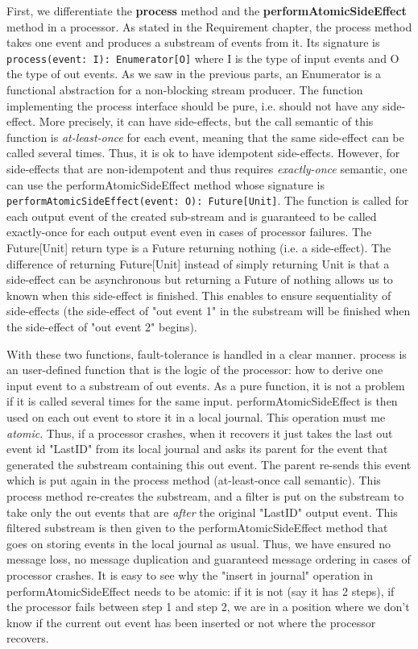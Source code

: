 First, we differentiate the \textbf{process} method and the \textbf{performAtomicSideEffect} method in a processor. As stated in the Requirement chapter, the process method 
takes one event and produces a substream of events from it. Its signature is \verb|process(event: I): Enumerator[O]| where I is the type of input events and O the type
of out events. As we saw in the previous parts, an Enumerator is a functional abstraction for a non-blocking stream producer. The function implementing the process interface
should be pure, i.e. should not have any side-effect. More precisely, it can have side-effects, but the call semantic of this function is \textit{at-least-once} for each 
event, meaning that the same side-effect can be called several times. Thus, it is ok to have idempotent side-effects. However, for side-effects that are non-idempotent and
thus requires \textit{exactly-once} semantic, one can use the performAtomicSideEffect method whose signature is \verb|performAtomicSideEffect(event: O): Future[Unit]|.
The function is called for each output event of the created sub-stream and is guaranteed to be called exactly-once for each output event even in cases of processor failures. The
Future[Unit] return type is a Future returning nothing (i.e. a side-effect). The difference of returning Future[Unit] instead of simply returning Unit is that a side-effect
can be asynchronous but returning a Future of nothing allows us to known when this side-effect is finished. This enables to ensure sequentiality of side-effects (the side-effect
of "out event 1" in the substream will be finished when the side-effect of "out event 2" begins).

With these two functions, fault-tolerance is handled in a clear manner. process is an user-defined function that is the logic of the processor: how to derive one input event to a substream of out events. As a pure function, it is not a problem if it is called several times for the same input. performAtomicSideEffect is then used on each out event to
store it in a local journal. This operation must me \textit{atomic}. Thus, if a processor crashes, when it recovers it just takes the last out event id "LastID" from its local journal and asks its parent for the event that generated the substream containing this out event. The parent re-sends this event which is put again in the process method (at-least-once call semantic).
This process method re-creates the substream, and a filter is put on the substream to take only the out events that are \textit{after} the original "LastID" output event. This
filtered substream is then given to the performAtomicSideEffect method that goes on storing events in the local journal as usual.
Thus, we have ensured no message loss, no message duplication and guaranteed message ordering in cases of processor crashes. It is easy to see why the "insert in journal" operation in performAtomicSideEffect needs to be atomic: if it is not (say it has 2 steps), if the processor fails between step 1 and step 2, we are in a position where
we don't know if the current out event has been inserted or not where the processor recovers. 

